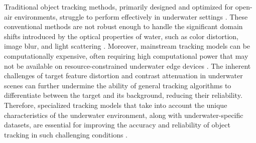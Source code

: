 Traditional object tracking methods, primarily designed and optimized for open-air environments, struggle to perform effectively in underwater settings \cite{elmezain2025advancing}. These conventional methods are not robust enough to handle the significant domain shifts introduced by the optical properties of water, such as color distortion, image blur, and light scattering \cite{elmezain2025advancing}. Moreover, mainstream tracking models can be computationally expensive, often requiring high computational power that may not be available on resource-constrained underwater edge devices \cite{qiu2024boundary}. The inherent challenges of target feature distortion and contrast attenuation in underwater scenes can further undermine the ability of general tracking algorithms to differentiate between the target and its background, reducing their reliability. Therefore, specialized tracking models that take into account the unique characteristics of the underwater environment, along with underwater-specific datasets, are essential for improving the accuracy and reliability of object tracking in such challenging conditions \cite{elmezain2025advancing}.

\endinput